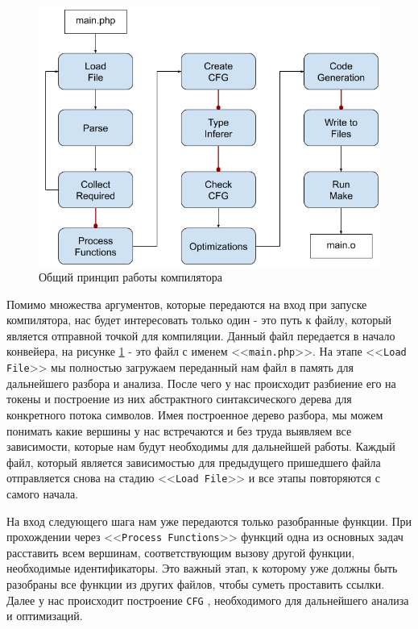 \begin{figure}[H]
    \caption{Общий принцип работы компилятора}
    \label{fig:compiler_arch}
    \centering
    \includegraphics[width=\linewidth]{images/compiler_arch}
\end{figure}

Помимо множества аргументов, которые передаются на вход при запуске компилятора, нас будет интересовать только один - это путь к файлу, который является отправной точкой для компиляции.
Данный файл передается в начало конвейера, на рисунке \ref{fig:compiler_arch} - это файл с именем <<\verb|main.php|>>.
На этапе <<\verb|Load File|>> мы полностью загружаем переданный нам файл в память для дальнейшего разбора и анализа.
После чего у нас происходит разбиение его на токены и построение из них абстрактного синтаксического дерева для конкретного потока символов.
Имея построенное дерево разбора, мы можем понимать какие вершины у нас встречаются и без труда выявляем все зависимости, которые нам будут необходимы для дальнейшей работы.
Каждый файл, который является зависимостью для предыдущего пришедшего файла отправляется снова на стадию <<\verb|Load File|>> и все этапы повторяются с самого начала.

На вход следующего шага нам уже передаются только разобранные функции.
При прохождении через <<\verb|Process Functions|>>  функций одна из основных задач расставить всем вершинам, соответствующим вызову другой функции, необходимые идентификаторы.
Это важный этап, к которому уже должны быть разобраны все функции из других файлов, чтобы суметь проставить ссылки. Далее у нас происходит построение \verb|CFG| \cite{CFG}, необходимого для дальнейшего анализа и оптимизаций.

